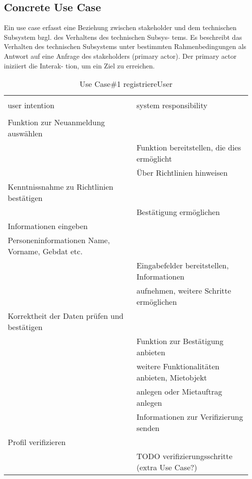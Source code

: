 \newpage
\subsection{Concrete Use Case}
Ein use case erfasst eine Beziehung zwischen stakeholder und dem technischen Subsystem bzgl. des Verhaltens des technischen Subsys- tems. Es beschreibt das Verhalten des technischen Subsystems unter bestimmten Rahmenbedingungen als Antwort auf eine Anfrage des stakeholders (primary actor). Der primary actor iniziiert die Interak- tion, um ein Ziel zu erreichen.

\begin{table}[H]
\caption{Use Case\#1 registriereUser }
\centering
\begin{tabular}{l l}
\\ [-0.5ex]

\hline\hline
\\ [-0.5ex]
user intention & system responsibility
\\ [1.5ex]
\hline
\\ [-0.5ex]
Funktion zur Neuanmeldung auswählen 				& 												\\[1ex]
													& Funktion bereitstellen, die dies ermöglicht	\\[1ex]
													& Über Richtlinien hinweisen 					\\[1ex]
Kenntnissnahme zu Richtlinien bestätigen			& 												\\[1ex]
													& Bestätigung ermöglichen						\\[1ex]
Informationen eingeben 								& 												\\[1ex] 
Personeninformationen Name, Vorname, Gebdat etc. 	& 												\\[1ex] 
													& Eingabefelder bereitstellen, Informationen    \\[1ex]
													& aufnehmen, weitere Schritte ermöglichen		\\[1ex]
Korrektheit der Daten prüfen und bestätigen			& 												\\[1ex]
													& Funktion zur Bestätigung anbieten 			\\[1ex]
													& weitere Funktionalitäten anbieten, Mietobjekt \\[1ex]
													& anlegen oder Mietauftrag anlegen				\\[1ex]
													& Informationen zur Verifizierung senden		\\[1ex]
Profil verifizieren									& 												\\[1ex]
													& TODO verifizierungsschritte (extra Use Case?)	\\[1ex]


\hline
\end{tabular}
\label{tab:anmeldenUC}
\end{table}

